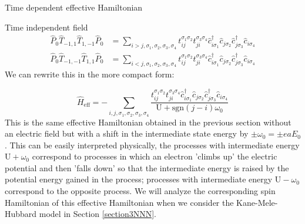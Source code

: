 \begin{section}{Time dependent effective Hamiltonian}
\begin{subsection}{Time independent field}
\begin{align*}
\hat{P}_0 \hat{T}_{-1,1} \hat{T}_{1,-1} \hat{P}_0 &= \sum_{i > j, \sigma_1, \sigma_2, \sigma_3, \sigma_4} t_{ij}^{\sigma_1 \sigma_2} t_{ji}^{\sigma_3 \sigma_4} \hat{c}_{i \sigma_1}^\dagger \hat{c}_{j \sigma_2} \hat{c}_{j \sigma_3}^\dagger \hat{c}_{i \sigma_4} \\
\hat{P}_0 \hat{T}_{-1,-1} \hat{T}_{1,1} \hat{P}_0 &= \sum_{i < j, \sigma_1, \sigma_2, \sigma_3, \sigma_4} t_{ij}^{\sigma_1 \sigma_2} t_{ji}^{\sigma_3 \sigma_4} \hat{c}_{i \sigma_1}^\dagger \hat{c}_{j \sigma_2} \hat{c}_{j \sigma_3}^\dagger \hat{c}_{i \sigma_4} 
\end{align*}
We can rewrite this in the more compact form:

\begin{equation}
\label{TimeIndepHeff}
\hat{H}_{\text{eff}} = -\sum_{i, j, \sigma_1, \sigma_2, \sigma_3, \sigma_4} \frac{t_{ij}^{\sigma_1 \sigma_2} t_{ji}^{\sigma_3 \sigma_4} \hat{c}_{i \sigma_1}^\dagger \hat{c}_{j \sigma_2} \hat{c}_{j \sigma_3}^\dagger \hat{c}_{i \sigma_4}}{\text{U} + \text{sgn}(j-i)\omega_0}
\end{equation}
This is the same effective Hamiltonian obtained in the previous section without an electric field but with a shift in the intermediate state energy by $\pm \omega_0 = \pm eaE_0$. This can be easily interpreted physically, the processes with intermediate energy $\text{U}+\omega_0$ correspond to processes in which an electron 'climbs up' the electric potential and then 'falls down' so that the intermediate energy is raised by the potential energy gained in the process; processes with intermediate energy $\text{U}-\omega_0$ correspond to the opposite process. We will analyze the corresponding spin Hamiltonian of this effective Hamiltonian when we consider the Kane-Mele-Hubbard model in Section \ref{section3NNN}.

\end{subsection}

\end{section}
